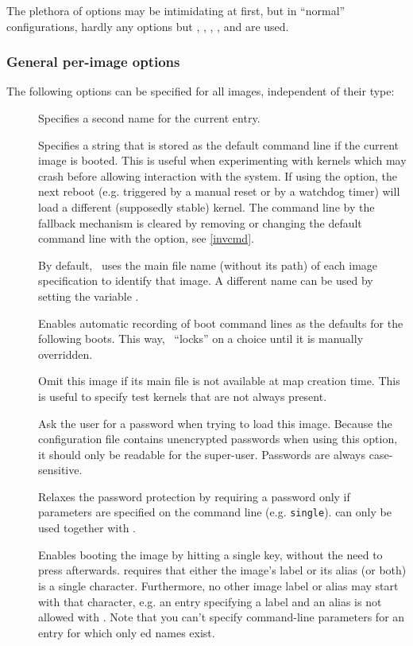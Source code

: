 The plethora of options may be intimidating at first, but in ``normal''
configurations, hardly any options but , ,
, , and  are used.


\subsubsection{General per-image options}
\label{cfggen}

The following options can be specified for all images, independent of their
type:
\begin{description}
  \item[] Specifies a second name for the current
    entry.
  \item[] Specifies a string that is stored
    as the default command line if the current image is booted. This is useful
    when experimenting with kernels which may crash before allowing
    interaction with the system. If using the  option, the
    next reboot (e.g. triggered by a manual reset or by a watchdog timer)
    will load a different (supposedly stable) kernel. The command line by the
    fallback mechanism is
    cleared by removing or changing the default command line with the 
    option, see \ref{invcmd}.
  \item[] By default, \LILO\ uses the main file name
    (without its
    path) of each image specification to identify that image. A different name
    can be used by setting the variable .
  \item[] Enables automatic recording of boot command lines as the
    defaults for the following boots. This way, \LILO\ ``locks'' on a
    choice until it is manually overridden.
  \item[] Omit this image if its main file is not available at
    map creation time. This is useful to specify test kernels that are not
    always present.
  \item[] Ask the user for a password when
    trying to load this image. Because the configuration file contains
    unencrypted passwords when using this option, it should only be readable
    for the super-user. Passwords are always case-sensitive.
  \item[] Relaxes the password protection by requiring a
    password only if parameters are specified on the command line
    (e.g. \verb"single").  can only be used together with
    .
  \item[] Enables booting the image by hitting a
    single key, without the need to press  afterwards.
     requires that either the image's label or its
    alias (or both) is a single character. Furthermore, no other image label
    or alias may start with that character, e.g. an entry specifying a
    label  and an alias  is not allowed with
    . Note that you can't specify command-line parameters for
    an entry for which only ed names exist.
\end{description}

